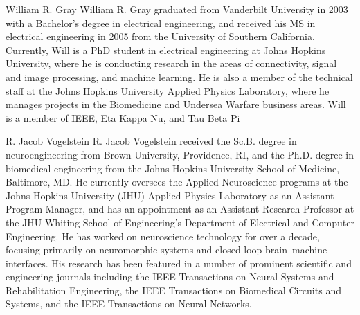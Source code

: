 \documentclass[10pt,journal,cspaper,compsoc]{IEEEtran}
\begin{document}
\begin{IEEEbiographynophoto}{William R. Gray}
William R. Gray graduated from Vanderbilt University in 2003 with a Bachelor’s degree in electrical engineering, and received his MS in electrical engineering in 2005 from the University of Southern California.  Currently, Will is a PhD student in electrical engineering at Johns Hopkins University, where he is conducting research in the areas of connectivity, signal and image processing, and machine learning.  He is also a member of the technical staff at the Johns Hopkins University Applied Physics Laboratory, where he manages projects in the Biomedicine and Undersea Warfare business areas.  Will is a member of IEEE, Eta Kappa Nu, and Tau Beta Pi
\end{IEEEbiographynophoto}


\begin{IEEEbiographynophoto}{R. Jacob Vogelstein}
R. Jacob Vogelstein received the Sc.B. degree in neuroengineering from Brown University, Providence, RI, and the Ph.D. degree in biomedical engineering from the Johns Hopkins University School of Medicine, Baltimore, MD.  He currently oversees the Applied Neuroscience programs at the Johns Hopkins University (JHU) Applied Physics Laboratory as an Assistant Program Manager, and has an appointment as an Assistant Research Professor at the JHU Whiting School of Engineering’s Department of Electrical and Computer Engineering. He has worked on neuroscience technology for over a decade, focusing primarily on neuromorphic systems and closed-loop brain–machine interfaces. His research has been featured in a number of prominent scientific and engineering journals including the IEEE Transactions on Neural Systems and Rehabilitation Engineering, the IEEE Transactions on Biomedical Circuits and Systems, and the IEEE Transactions on Neural Networks.  
\end{IEEEbiographynophoto}
\end{document}
